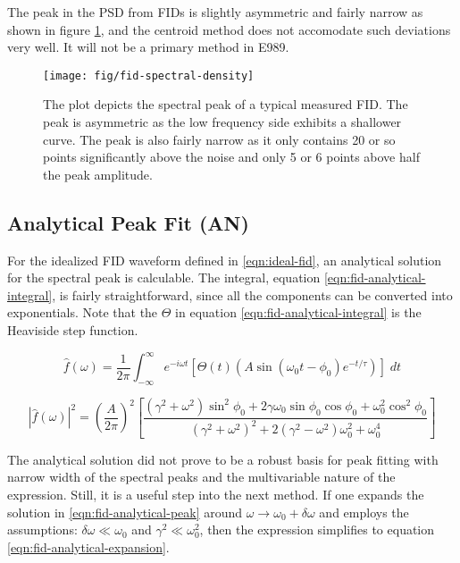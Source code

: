 The peak in the PSD from FIDs is slightly asymmetric and fairly narrow as shown in figure \ref{fig:fid-spectral-density}, and the centroid method does not accomodate such deviations very well.  It will not be a primary method in E989.

\begin{figure}
\centering
\texttt{[image: fig/fid-spectral-density]}
\caption{
    The plot depicts the spectral peak of a typical measured FID.  The peak is asymmetric as the low frequency side exhibits a shallower curve.  The peak is also fairly narrow as it only contains 20 or so points significantly above the noise and only 5 or 6 points above half the peak amplitude.
    \label{fig:fid-spectral-density}
}
\end{figure}

\subsection{Analytical Peak Fit (AN)} \label{s-sec:fid-analytical}
For the idealized FID waveform defined in \ref{eqn:ideal-fid}, an analytical solution for the spectral peak is calculable.  The integral, equation \ref{eqn:fid-analytical-integral}, is fairly straightforward, since all the components can be converted into exponentials.  Note that the $\Theta$ in equation \ref{eqn:fid-analytical-integral} is the Heaviside step function.

\begin{equation}
\label{eqn:fid-analytical-integral}
\hat{f}(\omega) = \frac{1}{2\pi} \int_{-\infty}^{\infty} 
e^{-i \omega t} \left[ \Theta(t) \left(A \sin(\omega_0 t - \phi_0) e^{-t / \tau} \right) \right] \;dt
\end{equation}

\begin{equation}
\label{eqn:fid-analytical-peak}
\left| \hat{f}(\omega) \right|^2 = 
\left( \frac{A}{2\pi} \right)^2
\left[\frac{(\gamma^2 + \omega^2) \sin^2{\phi_0} 
+ 2 \gamma \omega_0 \sin{\phi_0} \cos{\phi_0} + \omega_0^2 \cos^2{\phi_0}}{(\gamma^2 + \omega^2)^2 + 2(\gamma^2 - \omega^2) \omega_0^2 + \omega_0^4}
\right]
\end{equation}

The analytical solution did not prove to be a robust basis for peak fitting with narrow width of the spectral peaks and the multivariable nature of the expression.  Still, it is a useful step into the next method.  If one expands the solution in \ref{eqn:fid-analytical-peak} around $\omega \rightarrow \omega_0 + \delta \omega$ and employs the assumptions: $\delta \omega \ll \omega_0$ and $\gamma^2 \ll \omega_0^2$, then the expression simplifies to equation \ref{eqn:fid-analytical-expansion}.

